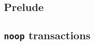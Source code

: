 \subsection{Prelude                      \lispTodo{}}   \label{txn data: processing: sysf: prelude}   
\subsection{\texttt{noop} transactions   \lispTodo{}}   \label{txn data: processing: sysf: noop}      
